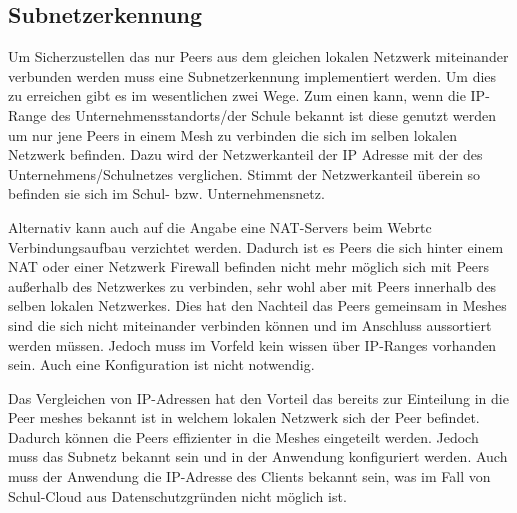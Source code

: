 %
\subsection{Subnetzerkennung}

Um Sicherzustellen das nur Peers aus dem gleichen lokalen Netzwerk miteinander verbunden werden muss eine Subnetzerkennung implementiert werden.
Um dies zu erreichen gibt es im wesentlichen zwei Wege. Zum einen kann, wenn die IP-Range des Unternehmensstandorts/der Schule bekannt ist diese genutzt werden um nur jene Peers in einem Mesh zu verbinden die sich im selben lokalen Netzwerk befinden. Dazu wird der Netzwerkanteil der IP Adresse mit der des Unternehmens/Schulnetzes verglichen. Stimmt der Netzwerkanteil überein so befinden sie sich im Schul- bzw. Unternehmensnetz. 

Alternativ kann auch auf die Angabe eine NAT-Servers beim Webrtc Verbindungsaufbau verzichtet werden. Dadurch ist es Peers die sich hinter einem NAT oder einer Netzwerk Firewall befinden nicht mehr möglich sich mit Peers außerhalb des Netzwerkes zu verbinden, sehr wohl aber mit Peers innerhalb des selben lokalen Netzwerkes. Dies hat den Nachteil das Peers gemeinsam in Meshes sind die sich nicht miteinander verbinden können und im Anschluss aussortiert werden müssen. Jedoch muss im Vorfeld kein wissen über IP-Ranges vorhanden sein. Auch eine Konfiguration ist nicht notwendig. 

Das Vergleichen von IP-Adressen hat den Vorteil das bereits zur Einteilung in die Peer meshes bekannt ist in welchem lokalen Netzwerk sich der Peer befindet. Dadurch können die Peers effizienter in die Meshes eingeteilt werden. Jedoch muss das Subnetz bekannt sein und in der Anwendung konfiguriert werden. Auch muss der Anwendung die IP-Adresse des Clients bekannt sein, was im Fall von Schul-Cloud aus Datenschutzgründen nicht möglich ist.

